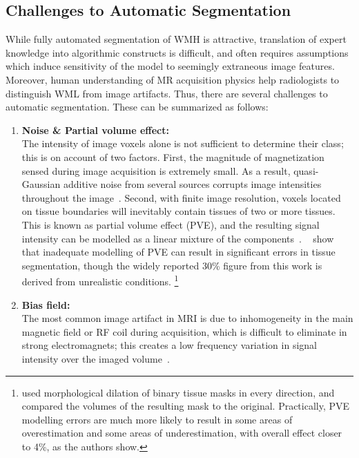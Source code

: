 \subsection{Challenges to Automatic Segmentation}\label{ss:autochallenges}
While fully automated segmentation of WMH is attractive,
translation of expert knowledge into algorithmic constructs is difficult, and often requires
assumptions which induce sensitivity of the model to seemingly extraneous image features.
Moreover, human understanding of MR acquisition physics
help radiologists to distinguish WML from image artifacts.
Thus, there are several challenges to automatic segmentation.
These can be summarized as follows:
\begin{enumerate}[itemsep=0pt,topsep=0pt]
  \item\label{chauto:npva}
    \textbf{Noise \& Partial volume effect:}\\
    The intensity of image voxels alone is not sufficient to determine their class;
    this is on account of two factors.    
    First, the magnitude of magnetization sensed during image acquisition is extremely small.
    As a result, quasi-Gaussian additive noise from several sources
    corrupts image intensities throughout the image~\cite{Dietrich2008a}.
    Second, with finite image resolution,
    voxels located on tissue boundaries will inevitably contain tissues of two or more tissues.
    This is known as partial volume effect (PVE), and the resulting signal intensity
    can be modelled as a linear mixture of the components~\cite{Santago1995,Khademi2014}.
    \citeauthor{Niessen1999}~\cite{Niessen1999} show that inadequate modelling of PVE
    can result in significant errors in tissue segmentation,
    though the widely reported 30\% figure from this work is derived from unrealistic conditions.%
    \footnote{\citeauthor{Niessen1999} used morphological dilation of binary tissue masks %
    in every direction, and compared the volumes of the resulting mask to the original.
    Practically, PVE modelling errors are much more likely to result in
    some areas of overestimation and some areas of underestimation,
    with overall effect closer to 4\%, as the authors show.}
  \item\label{chauto:bias}
  \textbf{Bias field:}\\
    The most common image artifact in MRI is due to
    inhomogeneity in the main magnetic field or RF coil during acquisition,
    which is difficult to eliminate in strong electromagnets; this creates
    a low frequency variation in signal intensity over the imaged volume~\cite{Juntu2005,Vovk2007}.

\end{enumerate}
